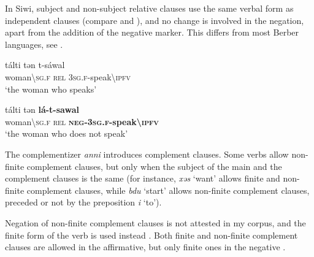 \documentclass[output=paper,colorlinks,citecolor=brown]{langscibook}
\begin{document}
In Siwi, subject and non-subject relative clauses use the same verbal form as independent clauses (compare  and ), and no change is involved in the negation, apart from the addition of the negative marker. This differs from most Berber languages, see .


\ea\label{ex:siw:30}
    \ea\label{ex:siw:30a}
        \gll tálti tən t-sáwal \\ 
             woman{\textbackslash}\textsc{sg.f} \textsc{rel} \textsc{3sg.f-}speak{\textbackslash}\textsc{ipfv} \\
        \glt ‘the woman who speaks’
    
    \ex\label{ex:siw:30b}
        \gll tálti tən \textbf{lá-t-sawal} \\
             woman{\textbackslash}\textsc{sg.f} \textsc{rel} \textbf{\textsc{neg-3sg.f-}speak{\textbackslash}\textsc{ipfv}} \\
        \glt ‘the woman who does not speak’
    \z
\z


The complementizer \textit{anni} introduces complement clauses. Some verbs allow non-finite complement clauses, but only when the subject of the main and the complement clauses is the same (for instance, \textit{xəs} ‘want’ allows finite and non-finite complement clauses, while \textit{bdu} ‘start’ allows non-finite complement clauses, preceded or not by the preposition \textit{i} ‘to’).

Negation of non-finite complement clauses is not attested in my corpus, and the finite form of the verb is used instead . Both finite  and non-finite  complement clauses are allowed in the affirmative, but only finite ones in the negative .

\end{document}
